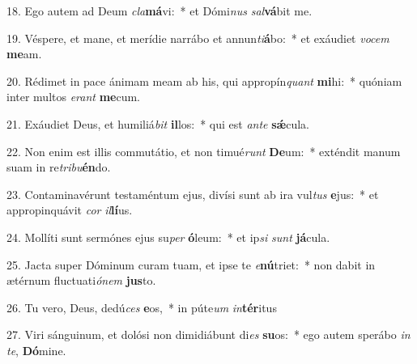 18. Ego autem ad Deum \textit{cla}\textbf{má}vi:~*  et Dómi\textit{nus} \textit{sal}\textbf{vá}bit me.\

19. Véspere, et mane, et merídie narrábo et annun\textit{ti}\textbf{á}bo:~*  et exáudiet \textit{vo}\textit{cem} \textbf{me}am.\

20. Rédimet in pace ánimam meam ab his, qui appropín\textit{quant} \textbf{mi}hi:~*  quóniam inter multos \textit{e}\textit{rant} \textbf{me}cum.\

21. Exáudiet Deus, et humiliá\textit{bit} \textbf{il}los:~*  qui est \textit{an}\textit{te} \textbf{sǽ}cula.\

22. Non enim est illis commutátio, et non timué\textit{runt} \textbf{De}um:~*  exténdit manum suam in re\textit{tri}\textit{bu}\textbf{én}do.\

23. Contaminavérunt testaméntum ejus, divísi sunt ab ira vul\textit{tus} \textbf{e}jus:~*  et appropinquávit \textit{cor} \textit{il}\textbf{lí}us.\

24. Mollíti sunt sermónes ejus su\textit{per} \textbf{ó}leum:~*  et ip\textit{si} \textit{sunt} \textbf{já}cula.\

25. Jacta super Dóminum curam tuam, et ipse te \textit{e}\textbf{nú}triet:~*  non dabit in ætérnum fluctuati\textit{ó}\textit{nem} \textbf{jus}to.\

26. Tu vero, Deus, dedú\textit{ces} \textbf{e}os,~*  in púte\textit{um} \textit{in}\textbf{tér}itus\

27. Viri sánguinum, et dolósi non dimidiábunt di\textit{es} \textbf{su}os:~*  ego autem sperábo \textit{in} \textit{te}, \textbf{Dó}mine.\

